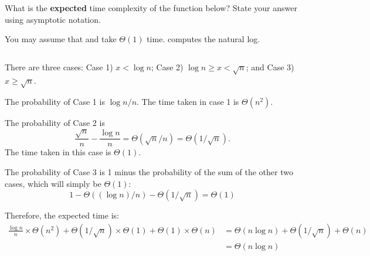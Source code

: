 \begin{prob}
    What is the \textbf{expected} time complexity of the function below?
    State your answer using asymptotic notation.

    You may assume that  and  take $\Theta(1)$
    time.  computes the natural log.

    \inputminted[lastline=15]{python}{\thisdir/code.py}


    \begin{soln}
        There are three cases: Case 1) $x < \log n$; Case 2) $\log n \geq x <
        \sqrt n$; and Case 3) $x \geq \sqrt{n}$.

        The probability of Case 1 is $\log n / n$. The time taken in case 1 is
        $\Theta(n^2)$.

        The probability of Case 2 is \[
            \frac{\sqrt n}{n} - \frac{\log n}{n} = \Theta(\sqrt n / n) = \Theta(1/\sqrt n).
        \] The time taken in this case is $\Theta(1)$.

        The probability of Case 3 is 1 minus the probability of the sum of the
        other two cases, which will simply be $\Theta(1)$: \[
            1 - \Theta((\log n) / n) - \Theta(1 / \sqrt{n}) = \Theta(1)
        \]

        Therefore, the expected time is:
        \begin{align*}
            \frac{\log n}{n} \times \Theta(n^2)
            + \Theta(1/\sqrt n) \times \Theta(1)
            + \Theta(1) \times \Theta(n)
            &=
            \Theta(n \log n) + \Theta(1 / \sqrt n) + \Theta(n)
            \\
            &=
            \Theta(n \log n)
        \end{align*}
    \end{soln}

\end{prob}

